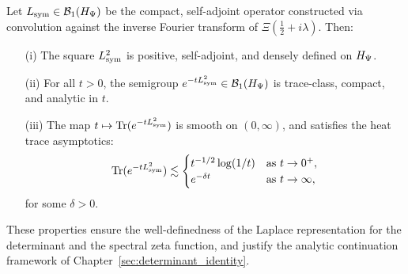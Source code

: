 \begin{lemma}
\label{lem:heat_semigroup_wellposed}
Let \( L_{\mathrm{sym}} \in \mathcal{B}_1(H_{\Psi}) \) be the compact, self-adjoint operator constructed via convolution against the inverse Fourier transform of \( \Xi\left( \tfrac{1}{2} + i\lambda \right) \). Then:

\begin{enumerate}
    \item[\textnormal{(i)}] The square \( L_{\mathrm{sym}}^2 \) is positive, self-adjoint, and densely defined on \( H_{\Psi} \).

    \item[\textnormal{(ii)}] For all \( t > 0 \), the semigroup \( e^{-t L_{\mathrm{sym}}^2} \in \mathcal{B}_1(H_{\Psi}) \) is trace-class, compact, and analytic in \( t \).

    \item[\textnormal{(iii)}] The map \( t \mapsto \operatorname{Tr}(e^{-t L_{\mathrm{sym}}^2}) \) is smooth on \( (0, \infty) \), and satisfies the heat trace asymptotics:
    \[
    \operatorname{Tr}(e^{-t L_{\mathrm{sym}}^2}) \lesssim
    \begin{cases}
    t^{-1/2} \log(1/t) & \text{as } t \to 0^+, \\
    e^{-\delta t} & \text{as } t \to \infty,
    \end{cases}
    \]
    for some \( \delta > 0 \).
\end{enumerate}

\medskip
\noindent
These properties ensure the well-definedness of the Laplace representation for the determinant and the spectral zeta function, and justify the analytic continuation framework of Chapter~\ref{sec:determinant_identity}.
\end{lemma}
